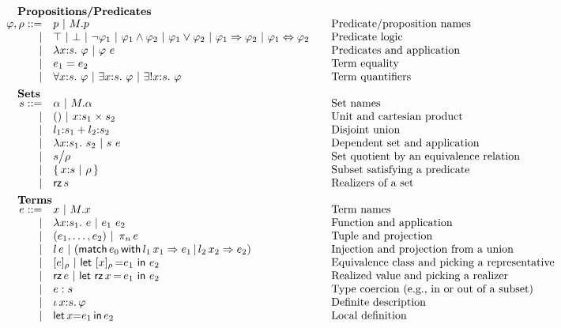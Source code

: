 \begin{figure}
	\[
	\begin{array}{rl@{\qquad}l}
		\noalign{\textbf{Propositions/Predicates}}
		\ip,\ipp ::= 
		    & \iP\ |\ \iselect{\im}{\iP}&\mbox{Predicate/proposition names}\\
		  | & \itrue \ | \ \ifalse\ |\ \inot{\ip_1}\ |\ \iand{\ip_1}{\ip_2}\ |\ 
		       \ior{\ip_1}{\ip_2}\ | \ \iimply{\ip_1}{\ip_2}\ |\ \iiff{\ip_1}{\ip_2} & \mbox{Predicate logic}\\
		  | & \ilambda{\ix}{\is}{\ip} \ |\ \iapp{\ip}{\ie} & \mbox{Predicates and application}\\
		  | & \iequal{\ie_1}{\ie_2} & \mbox{Term equality}\\
		  | & \iforall{\ix}{\is}{\ip} \ |\ 
		      \iexists{\ix}{\is}{\ip} \ |\
		      \iunique{\ix}{\is}{\ip} & \mbox{Term quantifiers}\\[5pt]
		
		\noalign{\textbf{Sets}}
		\is ::= 
		    & \iS \ |\ \iselect{\im}{\iS} &\mbox{Set names}\\
		  | & ()\ |\ \iprod{\ix}{\is_1}{\is_2} &\mbox{Unit and cartesian product}\\
		  | & \isum{\il_1}{\is_1}{\il_2}{\is_2} &\mbox{Disjoint union}\\
		  | & \ilambda{\ix}{\is_1}{\is_2}\ |\ 
		      \iapp{\is}{\ie} &\mbox{Dependent set and application}\\
		  | & \iquot{\is}{\ipp} & \mbox{Set quotient by an equivalence relation}\\
		  | & \isubset{\ix}{\is}{\ipp} & \mbox{Subset satisfying a predicate}\\
		  | & \irz{\is}&\mbox{Realizers of a set}\\[5pt] 
		
		\noalign{\textbf{Terms}}	
		\ie ::=
		    & \ix\ |\ \iselect{\im}{\ix} &\mbox{Term names}\\
		  | & \ilambda{\ix}{\is_1}{\ie}\ |\ 
		      \iapp{\ie_1}{\ie_2} &\mbox{Function and application}\\
		  | & \ituple{\ie_1}{\ie_2} 
		      \ibar \iproj{\ie}{n}&\mbox{Tuple and projection}\\
		  | & \iinj{\il}{\ie} 
		      \ibar (\imatch{\ie_0}{\il_1}{\ix_1}{\ie_1}{\il_2}{\ix_2}{\ie_2})&\mbox{Injection and projection from a union}\\
		  | & \ieclass{\ie}{\ipp}
		      \ibar \ileteclass{\ix}{\ipp}{\ie_1}{\ie_2}&\mbox{Equivalence class and picking a representative}\\
		  | & \irz{\ie}
		      \ibar \iletrz{\ix}{\ie_1}{\ie_2}&\mbox{Realized value and picking a realizer}\\
		  | & \iconstrain{\ie}{\is}&\mbox{Type coercion (e.g., in or out of a subset)}\\
		  | & \ithe{\ix}{\is}{\ip}&\mbox{Definite description}\\
		  | & \ilet{\ix}{\ie_1}{\ie_2}&\mbox{Local definition}\\[5pt]
		

\end{array}\]
\end{figure}
